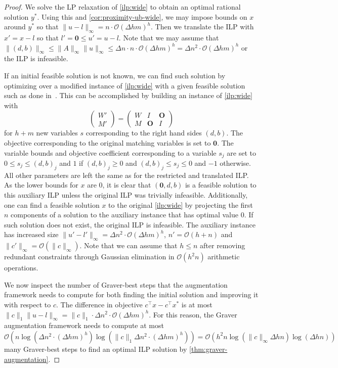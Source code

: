 \documentclass[a4paper,UKenglish,cleveref,thm-restate]{lipics-v2021}
\newcommand{\veczero}{\mathbf0}
\newcommand{\matzero}{\bm O}
\renewcommand{\O}{\mathcal O}
\begin{document}
\begin{proof}
    We solve the LP relaxation of \cref{ilp:wide} to obtain an optimal rational solution $y^*$. Using this and \cref{cor:proximity-ub-wide}, we may impose bounds on $x$ around $y^*$ so that $\|u-l\|_\infty=n\cdot\O(\Delta hm)^h$. Then we translate the ILP with $x'=x-l$ so that $l'=\veczero\le u'=u-l$. Note that we may assume that $\|(d,b)\|_\infty\le\|A\|_\infty\|u\|_\infty\le\Delta n\cdot n\cdot\O(\Delta hm)^h=\Delta n^2\cdot\O(\Delta hm)^h$ or the ILP is infeasible.

    If an initial feasible solution is not known, we can find such solution by optimizing over a modified instance of \cref{ilp:wide} with a given feasible solution such as done in~\cite{DBLP:journals/siamdm/JansenLR20}. This can be accomplished by building an instance of \cref{ilp:wide} with
    \[
        \begin{pmatrix}
            W'\\
            M'
        \end{pmatrix}=\begin{pmatrix}
            W&I&\matzero\\
            M&\matzero&I
        \end{pmatrix}
    \]
    for $h+m$ new variables $s$ corresponding to the right hand sides $(d,b)$. The objective corresponding to the original matching variables is set to $\veczero$. The variable bounds and objective coefficient corresponding to a variable $s_j$ are set to $0\le s_j\le(d,b)_j$ and $1$ if $(d,b)_j\ge0$ and $(d,b)_j\le s_j\le 0$ and $-1$ otherwise. All other parameters are left the same as for the restricted and translated ILP. As the lower bounds for $x$ are $0$, it is clear that $(\veczero,d,b)$ is a feasible solution to this auxiliary ILP unless the original ILP was trivially infeasible. Additionally, one can find a feasible solution $x$ to the original \cref{ilp:wide} by projecting the first $n$ components of a solution to the auxiliary instance that has optimal value $0$. If such solution does not exist, the original ILP is infeasible. The auxiliary instance has increased size $\|u'-l'\|_\infty=\Delta n^2\cdot\O(\Delta hm)^h$, $n'=\O(h+n)$ and $\|c'\|_\infty=\O(\|c\|_\infty)$. Note that we can assume that $h\le n$ after removing redundant constraints through Gaussian elimination in $\O(h^2n)$ arithmetic operations.

    We now inspect the number of Graver-best steps that the augmentation framework needs to compute for both finding the initial solution and improving it with respect to $c$. The difference in objective $c^\top x-c^\top x^*$ is at most $\|c\|_1\|u-l\|_\infty=\|c\|_1\cdot\Delta n^2\cdot\O(\Delta hm)^h$. For this reason, the Graver augmentation framework needs to compute at most $\O(n\log(\Delta n^2\cdot(\Delta hm)^h)\log(\|c\|_1\Delta n^2\cdot(\Delta hm)^h))=\O(h^2n\log(\|c\|_\infty\Delta hn)\log(\Delta hn))$ many Graver-best steps to find an optimal ILP solution by \cref{thm:graver-augmentation}.
\end{proof}
\end{document}
